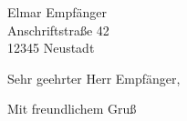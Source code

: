 \documentclass[
	NipponEL,
	fromphone=true,
	fromemail=true,
	fromalign=center,
	fromrule=false,
]{scrlttr2}
\begin{document}
	\begin{letter}{Elmar Empfänger\\Anschriftstraße 42\\12345 Neustadt}
		\opening{Sehr geehrter Herr Empfänger,}
		
		\Blindtext
		
		\closing{Mit freundlichem Gruß}
	\end{letter}
\end{document}
